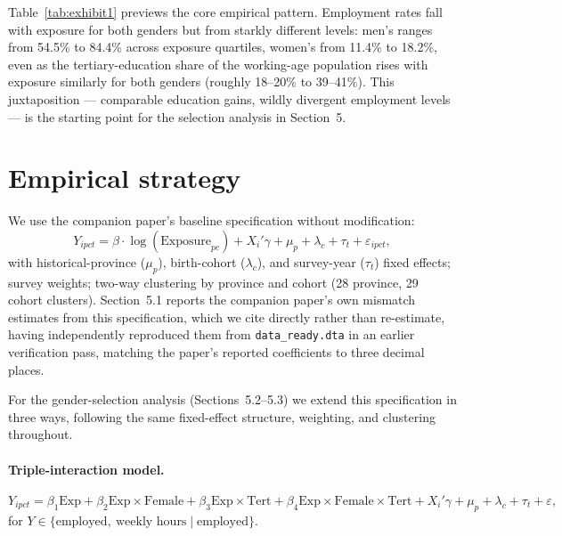 \documentclass[11pt]{article}
\begin{document}
Table~\ref{tab:exhibit1} previews the core empirical pattern. Employment rates fall with exposure for both genders but from starkly different levels: men's ranges from 54.5\% to 84.4\% across exposure quartiles, women's from 11.4\% to 18.2\%, even as the tertiary-education share of the working-age population rises with exposure similarly for both genders (roughly 18--20\% to 39--41\%). This juxtaposition --- comparable education gains, wildly divergent employment levels --- is the starting point for the selection analysis in Section~5.

\section{Empirical strategy}

We use the companion paper's baseline specification without modification:
\begin{equation}
Y_{ipct} = \beta \cdot \log(\text{Exposure}_{pc}) + X_i'\gamma + \mu_p + \lambda_c + \tau_t + \varepsilon_{ipct},
\end{equation}
with historical-province ($\mu_p$), birth-cohort ($\lambda_c$), and survey-year ($\tau_t$) fixed effects; survey weights; two-way clustering by province and cohort (28 province, 29 cohort clusters). Section~5.1 reports the companion paper's own mismatch estimates from this specification, which we cite directly rather than re-estimate, having independently reproduced them from \texttt{data\_ready.dta} in an earlier verification pass, matching the paper's reported coefficients to three decimal places.

For the gender-selection analysis (Sections~5.2--5.3) we extend this specification in three ways, following the same fixed-effect structure, weighting, and clustering throughout.

\paragraph{Triple-interaction model.}
\begin{equation}
Y_{ipct} = \beta_1 \text{Exp} + \beta_2 \text{Exp}\times\text{Female} + \beta_3 \text{Exp}\times\text{Tert} + \beta_4 \text{Exp}\times\text{Female}\times\text{Tert} + X_i'\gamma + \mu_p + \lambda_c + \tau_t + \varepsilon,
\end{equation}
for $Y \in \{\text{employed},\ \text{weekly hours} \mid \text{employed}\}$.
\end{document}
